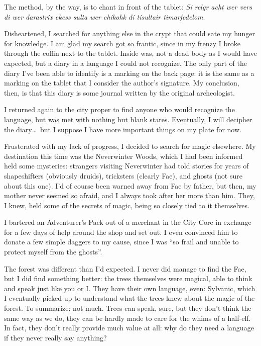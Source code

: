 The method, by the way, is to chant in front of the tablet: \textsl{Si relgr acht wer vers di wer darastrix ekess sulta wer chikohk di tisultair timarfedelom}.

Disheartened, I searched for anything else in the crypt that could sate my hunger for knowledge. I am glad my search got so frantic, since in my frenzy I broke through the coffin next to the tablet. Inside was, not a dead body as I would have expected, but a diary in a language I could not recognize. The only part of the diary I've been able to identify is a marking on the back page: it is the same as a marking on the tablet that I consider the author's signature. My conclusion, then, is that this diary is some journal written by the original archeologist.

I returned again to the city proper to find anyone who would recognize the language, but was met with nothing but blank stares. Eventually, I will decipher the diary\dots\ but I suppose I have more important things on my plate for now.

Frusterated with my lack of progress, I decided to search for magic elsewhere. My destination this time was the Neverwinter Woods, which I had been informed held some mysteries: strangers visiting Neverwinter had told stories for years of shapeshifters (obviously druids), tricksters (clearly Fae), and ghosts (not sure about this one). I'd of course been warned away from Fae by father, but then, my mother never seemed so afraid, and I always took after her more than him. They, I knew, held some of the secrets of magic, being so closely tied to it themselves.

I bartered an Adventurer's Pack out of a merchant in the City Core in exchange for a few days of help around the shop and set out. I even convinced him to donate a few simple daggers to my cause, since I was ``so frail and unable to protect myself from the ghosts''.

The forest was different than I'd expected. I never did manage to find the Fae, but I did find something better: the trees themselves were magical, able to think and speak just like you or I. They have their own language, even: Sylvanic, which I eventually picked up to understand what the trees knew about the magic of the forest. To summarize: not much. Trees can speak, sure, but they don't think the same way as we do, they can be hardly made to care for the whims of a half-elf. In fact, they don't really provide much value at all: why do they need a language if they never really say anything?

